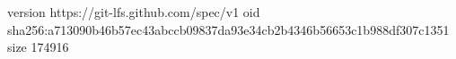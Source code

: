 version https://git-lfs.github.com/spec/v1
oid sha256:a713090b46b57ec43abccb09837da93e34cb2b4346b56653c1b988df307c1351
size 174916
